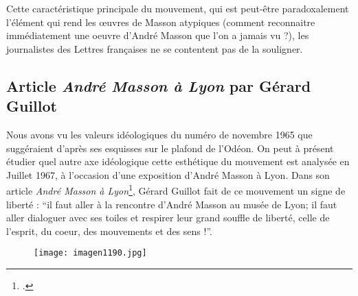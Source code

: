 	Cette caractéristique principale du mouvement, qui est peut-être paradoxalement l’élément qui rend les \oe{}uvres de Masson atypiques  (comment reconnaitre immédiatement une oeuvre d’André Masson que l’on a jamais vu ?), les journalistes des Lettres françaises ne se contentent pas de la souligner. 

	\subsection{Article \emph{André Masson à Lyon} par Gérard Guillot }

 Nous avons vu les valeurs idéologiques du numéro de novembre 1965 que suggéraient d’après ses esquisses sur le plafond de l’Odéon. On peut à présent étudier quel autre axe idéologique cette esthétique du mouvement est analysée en Juillet 1967, à l’occasion d’une exposition d’André Masson à Lyon. Dans son article \emph{André Masson à Lyon}\footcite{massonlyon}, Gérard Guillot fait de ce mouvement un signe de liberté : \enquote{il faut aller à la rencontre d’André Masson au musée de Lyon; il faut aller dialoguer avec ses toiles et respirer leur grand souffle de liberté, celle de l’esprit, du coeur, des mouvements et des sens !}. 

\begin{figure}[H]
   \centering
   \texttt{[image: imagen1190.jpg]}
	\caption{\cite{massonlyon}}\label{fig:MassonLyon}
\end{figure}

